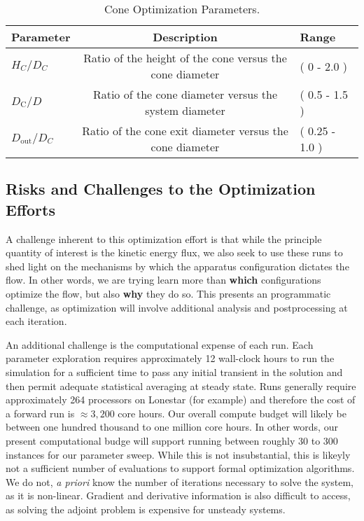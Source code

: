 %
%
\large
\begin{center}
\begin{table}[h]
 \centering
  \begin{tabular}{| l | c | l |}
    \hline
    Parameter & Description & Range \\
    \hline
    $H_C/D_C$ & Ratio of the height of the cone versus the cone diameter & ( 0 - 2.0 ) \\
    $D_{\text{C}}/D$ & Ratio of the cone diameter versus the system
       diameter & ( 0.5 - 1.5 ) \\
    $D_{\text{out}}/D_C$ & Ratio of the cone exit diameter versus the
       cone diameter & ( 0.25 - 1.0 ) \\ 
    \hline
  \end{tabular}
  \caption{Cone Optimization Parameters.}
  \label{tab:cone}
\end{table}
\end{center}
\normalsize

\subsection{Risks and Challenges to the Optimization Efforts}

A challenge inherent to this optimization effort is that while the
principle quantity of interest is the kinetic energy flux, we also seek
to use these runs to shed light on the mechanisms by which the apparatus
configuration dictates the flow. In other words, we are trying learn
more than \textbf{which} configurations optimize the flow, but also 
\textbf{why} they do so. This presents an programmatic challenge, as
optimization will involve additional analysis and postprocessing at each
iteration.  

%
%
An additional challenge is the computational expense of each run. Each
parameter exploration requires approximately 12 wall-clock hours to run
the simulation for a sufficient time to pass any initial transient in
the solution and then permit adequate statistical averaging at steady
state. Runs generally require approximately 264 processors on Lonestar
(for example) and therefore the cost of a forward run is $\approx 3,200$
core hours. Our overall compute budget will likely be between one hundred
thousand to one million core hours. In other words, our present
computational budge will support running between roughly 30 to 300
instances for our parameter sweep. While this is not insubstantial, this
is likeyly not a sufficient number of evaluations to support formal
optimization algorithms. We do not, \textit{a priori} know the number of
iterations necessary to solve the system, as it is non-linear. Gradient
and derivative information is also difficult to access, as solving the
adjoint problem is expensive for unsteady systems. 

